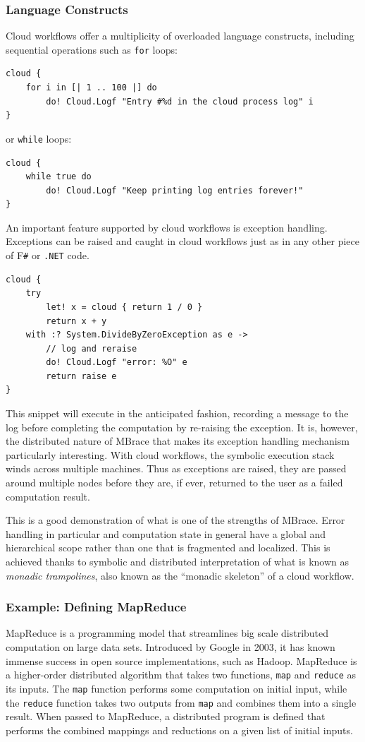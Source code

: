 \documentclass[9pt,a4paper]{article}
\newcommand{\mbrace}{MBrace}
\newcommand{\fsharp}{F\texttt \#}
\newcommand{\dotnet}{\texttt{\hbox{.}NET}}
\begin{document}
\subsubsection*{Language Constructs}
%
Cloud workflows offer a multiplicity of overloaded language constructs,
including sequential operations such as \texttt{for} loops:
\begin{lstlisting}
cloud {
    for i in [| 1 .. 100 |] do
        do! Cloud.Logf "Entry #%d in the cloud process log" i
}
\end{lstlisting}
or \texttt{while} loops:
\begin{lstlisting}
cloud {
    while true do
        do! Cloud.Logf "Keep printing log entries forever!"
}
\end{lstlisting}
%
An important feature supported by cloud workflows is exception handling. 
Exceptions can be raised and caught in cloud workflows just as in any other piece 
of \fsharp{} or \dotnet{} code. 
\begin{lstlisting}
cloud {
    try
        let! x = cloud { return 1 / 0 }
        return x + y
    with :? System.DivideByZeroException as e ->
        // log and reraise
        do! Cloud.Logf "error: %O" e
        return raise e
}
\end{lstlisting}
This snippet will execute in the anticipated fashion, recording a message to the log
before completing the computation by re-raising the exception.
It is, however, the distributed nature of \mbrace{} that makes its exception 
handling mechanism particularly interesting. With cloud workflows, the symbolic execution
stack winds across multiple machines. Thus as exceptions are raised, they are passed
around multiple nodes before they are, if ever, returned to the user as a failed
computation result.

This is a good demonstration of what is one of the strengths of \mbrace.
Error handling in particular and computation state in general have a global and hierarchical
scope rather than one that is fragmented and localized.
This is achieved thanks to symbolic and distributed interpretation of what is known as
\emph{monadic trampolines}\cite{data-types-ala-carte, scala-trampolines}, 
also known as the ``monadic skeleton'' of a cloud workflow.


\subsubsection*{Example: Defining MapReduce}

MapReduce is a programming model that streamlines big scale distributed computation
on large data sets. Introduced by Google in 2003, it has known immense success in open
source implementations, such as Hadoop. MapReduce is a higher-order distributed algorithm
that takes two functions, \texttt{map} and \texttt{reduce} as its inputs. The \texttt{map}
function performs some computation on initial input, while the \texttt{reduce} function
takes two outputs from \texttt{map} and combines them into a single result. 
When passed to MapReduce, a distributed program is defined that performs the combined 
mappings and reductions on a given list of initial inputs.
\end{document}
